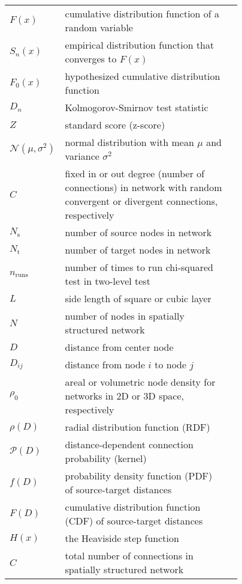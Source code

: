 \begin{longtable}{lp{0.77\linewidth}@{\hspace{2\tabcolsep}p.~}r}
	$F(x)$ & cumulative distribution function of a random variable & \pageref{eq:cumF} \\
  $S_n(x)$ & empirical distribution function that converges to $F(x)$ & \pageref{eq:edf} \\
	$F_0(x)$ & hypothesized cumulative distribution function & \pageref{eq:F0} \\
	$D_n	$ & Kolmogorov-Smirnov test statistic & \pageref{eq:ks_stat} \\
	
	$Z$ & standard score (z-score) & \pageref{eq:Z} \\
	$\mathcal{N}(\mu, \sigma^2)$ & normal distribution with mean $\mu$ and variance $\sigma^2$ & \pageref{eq:normal} \\

	
	$C$ & fixed in or out degree (number of connections) in network with random convergent or divergent connections, respectively & \pageref{eq:C} \\
	$N_\text{s}$ & number of source nodes in network & \pageref{eq:Ns} \\
	$N_\text{t}$ & number of target nodes in network & \pageref{eq:Nt} \\
	$n_\text{runs}$ & number of times to run chi-squared test in two-level test & \pageref{eq:nruns} \\
  
  $L$ & side length of square or cubic layer & \pageref{eq:L} \\
  $N$ & number of nodes in spatially structured network & \pageref{eq:N} \\
  $D$ & distance from center node & \pageref{eq:Dij} \\
  $D_{ij}$ & distance from node $i$ to node $j$ & \pageref{eq:Dij} \\
  $\rho_0$ & areal or volumetric node density for networks in 2D or 3D space, respectively & \pageref{eq:rho0} \\
  $\rho(D)$ & radial distribution function (RDF) & \pageref{eq:radial} \\
  $\mathcal{P}(D)$ & distance-dependent connection probability (kernel) & \pageref{eq:kernel} \\
  $f(D)$ & probability density function (PDF) of source-target distances & \pageref{eq:f} \\
  $F(D)$ & cumulative distribution function (CDF) of source-target distances & \pageref{eq:F} \\
  $H(x)$ & the Heaviside step function & \pageref{eq:Heaviside} \\
	
	$C$ & total number of connections in spatially structured network & \pageref{C_spatial} \\ 
   
\end{longtable}
\clearchapter


